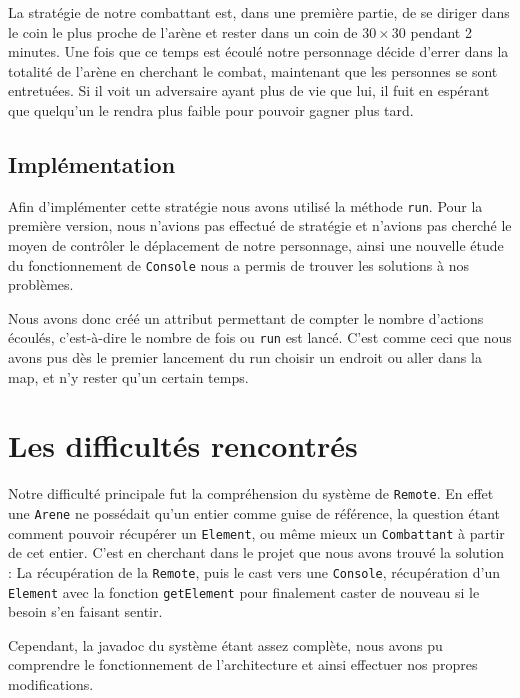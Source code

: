 \documentclass[12pt,a4paper,openany]{book}
\newcommand{\removepagebreak}{\renewcommand{\pagebreak}{}\renewcommand{\clearpage}{}\renewcommand{\cleardoublepage}{}}
\begin{document}
La stratégie de notre combattant est, dans une première partie, de se diriger dans le coin le plus
proche de l'arène et rester dans un coin de $30\times 30$ pendant 2 minutes. Une fois que ce temps est écoulé notre personnage décide d'errer dans la totalité de
l'arène en cherchant le combat, maintenant que les personnes se sont entretuées. Si il voit un adversaire ayant plus de vie que lui, il fuit en espérant que
quelqu'un le rendra plus faible pour pouvoir gagner plus tard.

\section{Implémentation}
Afin d'implémenter cette stratégie nous avons utilisé la méthode \texttt{run}. Pour la première version, nous n'avions pas effectué de stratégie et n'avions pas
cherché le moyen de contrôler le déplacement de notre personnage, ainsi une nouvelle étude du fonctionnement de \texttt{Console} nous a permis de trouver les
solutions à nos problèmes.

Nous avons donc créé un attribut permettant de compter le nombre d'actions écoulés, c'est-à-dire le nombre de fois ou \texttt{run} est lancé. C'est comme ceci
que nous avons pus dès le premier lancement du run choisir un endroit ou aller dans la map, et n'y rester qu'un certain temps.

\chapter{Les difficultés rencontrés}
		Notre difficulté principale fut la compréhension du système de \texttt{Remote}. En effet une \texttt{Arene} ne possédait qu'un
		entier comme guise de référence, la question étant comment pouvoir récupérer un \texttt{Element}, ou même mieux un \texttt{Combattant} à partir de cet
		entier. C'est en cherchant dans le projet que nous avons trouvé la solution : La récupération de la \texttt{Remote}, puis le cast vers une \texttt{Console}, récupération d'un
		\texttt{Element} avec la fonction \texttt{getElement} pour finalement caster de nouveau si le besoin s'en faisant sentir.

		Cependant, la javadoc du système étant assez complète, nous avons pu comprendre le fonctionnement de l'architecture et ainsi effectuer nos propres
		modifications.	

\appendix
\newpage
\removepagebreak
\end{document}
